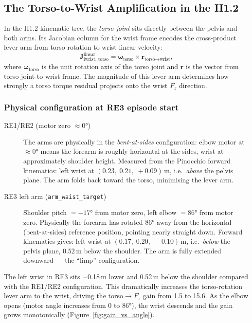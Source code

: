 \documentclass[11pt,a4paper]{article}
\newcommand{\bJ}{\bm{J}}
\begin{document}
\subsection{The Torso-to-Wrist Amplification in the H1.2}
\label{sec:torso_amp}

In the H1.2 kinematic tree, the \emph{torso joint} sits directly between
the pelvis and both arms.  Its Jacobian column for the wrist frame encodes
the cross-product lever arm from torso rotation to wrist linear velocity:
\begin{equation}
  \bJ_\text{lwrist, torso}^\text{linear}
  = \bm{\omega}_\text{torso} \times \bm{r}_{\text{torso}\to\text{wrist}},
\end{equation}
where $\bm{\omega}_\text{torso}$ is the unit rotation axis of the torso
joint and $\bm{r}$ is the vector from torso joint to wrist frame.  The
magnitude of this lever arm determines how strongly a torso torque residual
projects onto the wrist $F_z$ direction.

\subsubsection*{Physical configuration at RE3 episode start}

\begin{description}
\item[RE1/RE2 (motor zero $\approx 0°$)] The arms are physically in the
  \emph{bent-at-sides} configuration: elbow motor at $\approx 0°$ means the
  forearm is roughly horizontal at the sides, wrist at approximately
  shoulder height.  Measured from the Pinocchio forward kinematics: left
  wrist at $(0.23,\; 0.21,\; +0.09)\,$m, i.e.\ \emph{above} the pelvis
  plane.  The arm folds back toward the torso, minimising the lever arm.

\item[RE3 left arm (\texttt{arm\_waist\_target})] Shoulder pitch $= -17°$
  from motor zero, left elbow $= 86°$ from motor zero.  Physically the
  forearm has rotated $86°$ away from the horizontal (bent-at-sides)
  reference position, pointing nearly straight down.  Forward kinematics
  gives: left wrist at $(0.17,\; 0.20,\; -0.10)\,$m, i.e.\ \emph{below}
  the pelvis plane, 0.52\,m below the shoulder.  The arm is fully extended
  downward --- the ``limp'' configuration.
\end{description}

The left wrist in RE3 sits $\sim$0.18\,m lower and 0.52\,m below the
shoulder compared with the RE1/RE2 configuration.  This dramatically
increases the torso-rotation lever arm to the wrist, driving the
torso$\to$$F_z$ gain from 1.5 to 15.6.  As the elbow opens (motor angle
increases from 0 to 86°), the wrist descends and the gain grows
monotonically (Figure~\ref{fig:gain_vs_angle}).
\end{document}
